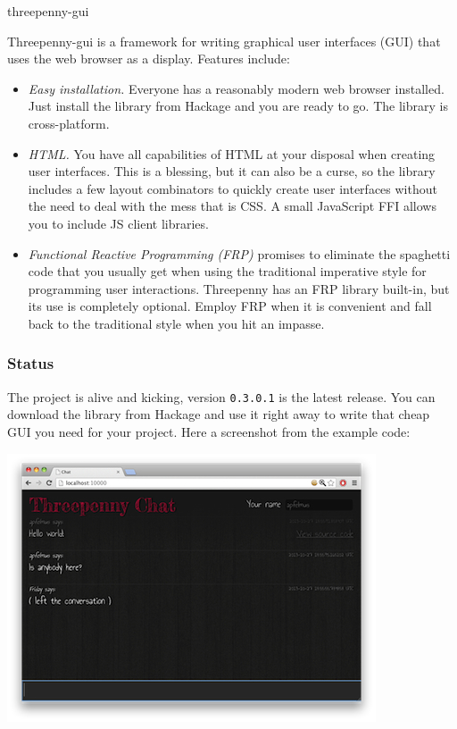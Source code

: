 \begin{hcarentry}[new]{threepenny-gui}
\label{threepenny-gui}
\makeheader

Threepenny-gui is a framework for writing graphical user interfaces (GUI) that uses the web browser as a display. Features include:

\begin{itemize}
\item \emph{Easy installation.} Everyone has a reasonably modern web browser installed. Just install the library from Hackage and you are ready to go. The library is cross-platform.
\item \emph{HTML.} You have all capabilities of HTML at your disposal when creating user interfaces. This is a blessing, but it can also be a curse, so the library includes a few layout combinators to quickly create user interfaces without the need to deal with the mess that is CSS. A small JavaScript FFI allows you to include JS client libraries.
\item \emph{Functional Reactive Programming (FRP)} promises to eliminate the spaghetti code that you usually get when using the traditional imperative style for programming user interactions. Threepenny has an FRP library built-in, but its use is completely optional. Employ FRP when it is convenient and fall back to the traditional style when you hit an impasse.
\end{itemize}

\subsubsection*{Status}

The project is alive and kicking, version \verb`0.3.0.1` is the latest release. You can download the library from Hackage and use it right away to write that cheap GUI you need for your project. Here a screenshot from the example code:

\begin{center}
\includegraphics[width=\textwidth]{html/chat.jpg}
\end{center}


\end{hcarentry}
